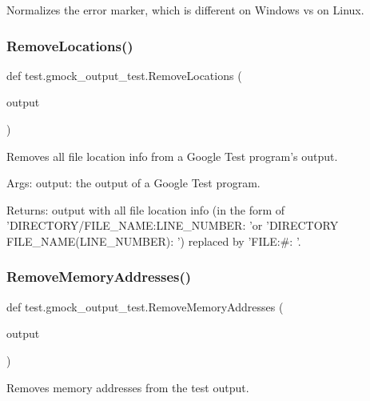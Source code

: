 \begin{DoxyVerb}Normalizes the error marker, which is different on Windows vs on Linux.\end{DoxyVerb}
 \mbox{\label{namespacetest_1_1gmock__output__test_acbc6816547709cddc5fe848ee9c29fee}} 
\subsubsection{\texorpdfstring{RemoveLocations()}{RemoveLocations()}}
{\footnotesize\ttfamily def test.\+gmock\+\_\+output\+\_\+test.\+Remove\+Locations (\begin{DoxyParamCaption}\item[{}]{output }\end{DoxyParamCaption})}

\begin{DoxyVerb}Removes all file location info from a Google Test program's output.

Args:
     output:  the output of a Google Test program.

Returns:
     output with all file location info (in the form of
     'DIRECTORY/FILE_NAME:LINE_NUMBER: 'or
     'DIRECTORY\\FILE_NAME(LINE_NUMBER): ') replaced by
     'FILE:#: '.
\end{DoxyVerb}
 \mbox{\label{namespacetest_1_1gmock__output__test_a31a24231c5eff18b7677b4959907caae}} 
\subsubsection{\texorpdfstring{RemoveMemoryAddresses()}{RemoveMemoryAddresses()}}
{\footnotesize\ttfamily def test.\+gmock\+\_\+output\+\_\+test.\+Remove\+Memory\+Addresses (\begin{DoxyParamCaption}\item[{}]{output }\end{DoxyParamCaption})}

\begin{DoxyVerb}Removes memory addresses from the test output.\end{DoxyVerb}
 \mbox{\label{namespacetest_1_1gmock__output__test_a50061d02842fdef09ed5a2d6ac336721}} 
